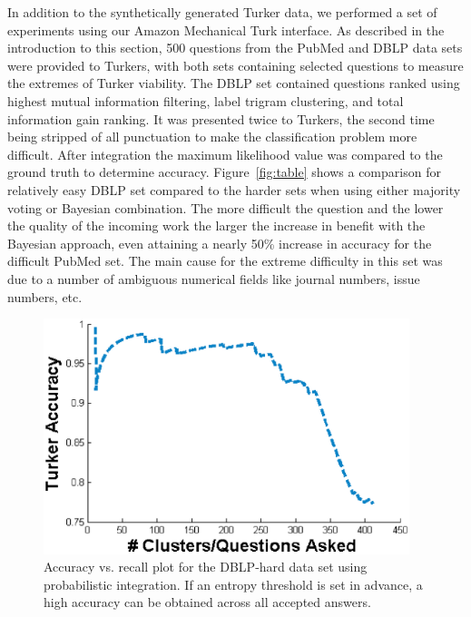 In addition to the synthetically generated Turker data, we performed a set of experiments using our Amazon Mechanical Turk interface.  As described in the introduction to this section, 500 questions from the PubMed and DBLP data sets were provided to Turkers, with both sets containing selected questions to measure the extremes of Turker viability.  The DBLP set contained questions ranked using highest mutual information filtering, label trigram clustering, and total information gain ranking.  It was presented twice to Turkers, the second time being stripped of all punctuation to make the classification problem more difficult.  After integration the maximum likelihood value was compared to the ground truth to determine accuracy.  Figure~\ref{fig:table} shows a comparison for relatively easy DBLP set compared to the harder sets when using either majority voting or Bayesian combination.  The more difficult the question and the lower the quality of the incoming work the larger the increase in benefit with the Bayesian approach, even attaining a nearly 50\% increase in accuracy for the difficult PubMed set.  The main cause for the extreme difficulty in this set was due to a number of ambiguous numerical fields like journal numbers, issue numbers, etc.


\begin{figure}[t]
\centering
        \includegraphics[width=0.95\textwidth]{recall_dblp.eps}
        \caption{Accuracy vs. recall plot for the DBLP-hard data set using probabilistic integration.  If an entropy threshold is set in advance, a high accuracy can be obtained across all accepted answers.}
        \label{fig:recall}
\end{figure}

